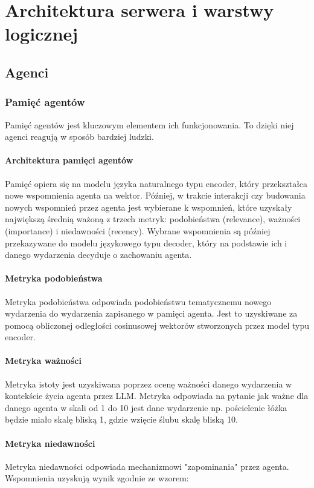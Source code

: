 \section{Architektura serwera i warstwy logicznej}
\label{sec:architektura_serwera}

\subsection{Agenci}

\subsubsection{Pamięć agentów}
Pamięć agentów jest kluczowym elementem ich funkcjonowania.
To dzięki niej agenci reagują w sposób bardziej ludzki.

\paragraph{Architektura pamięci agentów}
Pamięć opiera się na modelu języka naturalnego typu encoder, który przekształca
nowe wspomnienia agenta na wektor. Później, w trakcie interakcji czy budowania nowych
wspomnień przez agenta jest wybierane k wspomnień, które uzyskały największą średnią
ważoną z trzech metryk: podobieństwa (relevance), ważności (importance) i niedawności (recency).
Wybrane wspomnienia są później przekazywane do modelu językowego typu decoder, który na
podstawie ich i danego wydarzenia decyduje o zachowaniu agenta.

\paragraph{Metryka podobieństwa}
Metryka podobieństwa odpowiada podobieństwu tematycznemu nowego wydarzenia do
wydarzenia zapisanego w pamięci agenta. Jest to uzyskiwane za pomocą obliczonej
odległości cosinusowej wektorów stworzonych przez model typu encoder.

\paragraph{Metryka ważności}
Metryka istoty jest uzyskiwana
poprzez ocenę ważności danego wydarzenia w kontekście życia agenta przez LLM.
Metryka odpowiada na pytanie jak ważne dla danego agenta w skali od 1 do 10 jest
dane wydarzenie np. pościelenie łóżka będzie miało skalę bliską 1, gdzie wzięcie
ślubu skalę bliską 10.

\paragraph{Metryka niedawności}
Metryka niedawności odpowiada mechanizmowi "zapominania" przez agenta.
Wspomnienia uzyskują wynik zgodnie ze wzorem:

